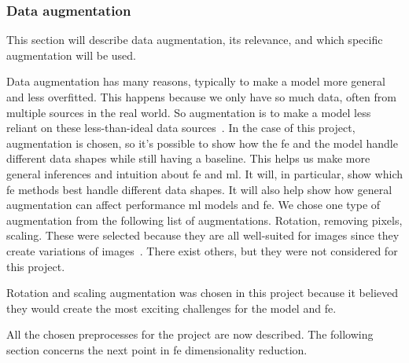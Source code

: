 \subsubsection{Data augmentation}\label{subsec:data-augmentation}
This section will describe data augmentation, its relevance, and which specific augmentation will be used.


Data augmentation has many reasons, typically to make a model more general and less overfitted. This happens because we only have so much data, often from multiple sources in the real world. So augmentation is to make a model less reliant on these less-than-ideal data sources~\cite {MAHARANA202291}.
In the case of this project, augmentation is chosen, so it's possible to show how the \gls{fe} and the model handle different data shapes while still having a baseline. This helps us make more general inferences and intuition about \gls{fe} and \gls{ml}. It will, in particular, show which \gls{fe} methods best handle different data shapes. It will also help show how general augmentation can affect performance \gls{ml} models and \gls{fe}.
We chose one type of augmentation from the following list of augmentations. Rotation, removing pixels, scaling. These were selected because they are all well-suited for images since they create variations of images~\cite{gonzalez2008digital}. There exist others, but they were not considered for this project. 

Rotation and scaling augmentation was chosen in this project because it believed they would create the most exciting challenges for the model and \gls{fe}. 

All the chosen preprocesses for the project are now described. The following section concerns the next point in \gls{fe} dimensionality reduction. 



